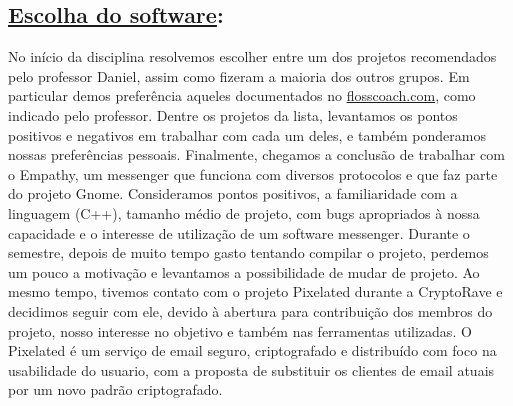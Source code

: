 \subsection*{\underline{Escolha do software}:}
  No início da disciplina resolvemos escolher entre um dos projetos recomendados pelo professor
  Daniel, assim como fizeram a maioria dos outros grupos. Em particular demos preferência aqueles
  documentados no \url{flosscoach.com}, como indicado pelo professor.
Dentre os projetos da lista, levantamos os pontos positivos e negativos em trabalhar com cada um deles, e
também ponderamos nossas preferências pessoais. Finalmente, chegamos a conclusão de trabalhar com o
Empathy, um messenger que funciona com diversos protocolos e que faz parte do projeto Gnome.
Consideramos pontos positivos, a familiaridade com a linguagem (C++), tamanho médio de projeto, com bugs
apropriados à nossa capacidade e o interesse de utilização de um software messenger.
Durante o semestre, depois de muito tempo gasto tentando compilar o projeto, perdemos um pouco a motivação
 e levantamos a possibilidade de mudar de projeto.  Ao mesmo tempo, tivemos contato com o projeto Pixelated
 durante a CryptoRave e decidimos seguir com ele, devido à abertura para contribuição dos membros do
 projeto, nosso interesse no objetivo e também nas ferramentas utilizadas.
O Pixelated é um serviço de email seguro, criptografado e distribuído com foco na usabilidade do usuario, com a proposta de substituir os clientes de email atuais por um novo padrão criptografado.

